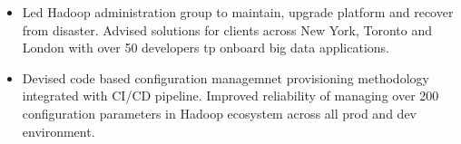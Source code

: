 \begin{itemize}[leftmargin=*, topsep=1pt, partopsep=2.5pt]
\begin{itemize}[leftmargin=*, topsep=-5pt, partopsep=2.5pt]
\setlength\itemsep{-0.2em}
\item Led Hadoop administration group to maintain, upgrade platform and recover from disaster. Advised solutions for clients across New York, Toronto and London with over 50 developers tp onboard big data applications.
\item Devised code based configuration managemnet provisioning methodology integrated with CI/CD pipeline. Improved reliability of managing over 200 configuration parameters in Hadoop ecosystem across all prod and dev environment.
\end{itemize}

\end{itemize}

